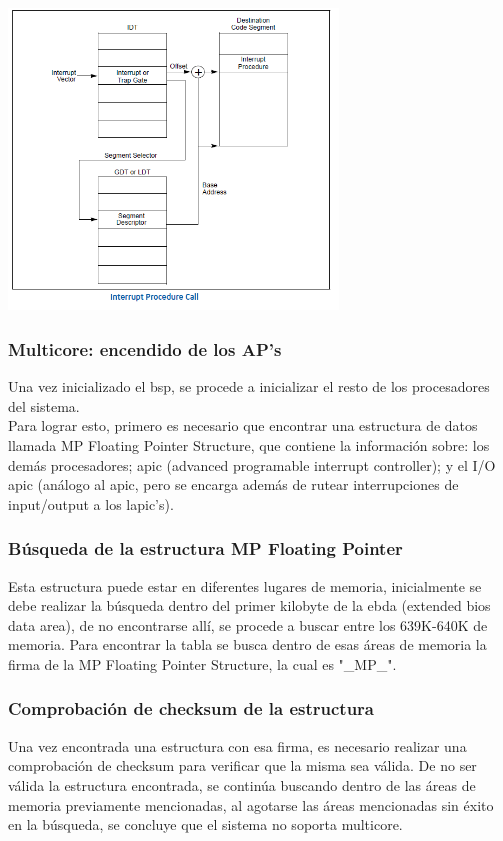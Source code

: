 \documentclass{beamer}
\begin{document}
	\begin{frame}
	    \begin{center}
	        \includegraphics[height=8cm]{images/interrupts.png}
	    \end{center}
	\end{frame}

	\begin{frame}
		\frametitle{Multicore: encendido de los AP's}

		Una vez inicializado el bsp, se procede a inicializar el resto de los procesadores del sistema.\\
		Para lograr esto, primero es necesario que encontrar una estructura de datos llamada MP Floating Pointer Structure, que contiene la información sobre: los demás procesadores; apic (advanced programable interrupt controller); y el I/O apic (análogo al apic, pero se encarga además de rutear interrupciones de input/output a los lapic's).
	\end{frame}

	\begin{frame}
		\frametitle{Búsqueda de la estructura MP Floating Pointer}
		Esta estructura puede estar en diferentes lugares de memoria, inicialmente se debe realizar la búsqueda dentro del primer kilobyte de la ebda (extended bios data area), de no encontrarse allí, se procede a buscar entre los 639K-640K de memoria.
		Para encontrar la tabla se busca dentro de esas áreas de memoria la firma de la MP Floating Pointer Structure, la cual es "\_MP\_".
	\end{frame}

	\begin{frame}
		\frametitle{Comprobación de checksum de la estructura}
		Una vez encontrada una estructura con esa firma, es necesario realizar una comprobación de checksum para verificar que la misma sea válida.
		De no ser válida la estructura encontrada, se continúa buscando dentro de las áreas de memoria previamente mencionadas, al agotarse las áreas mencionadas sin éxito en la búsqueda, se concluye que el sistema no soporta multicore.
	\end{frame}
\end{document}
